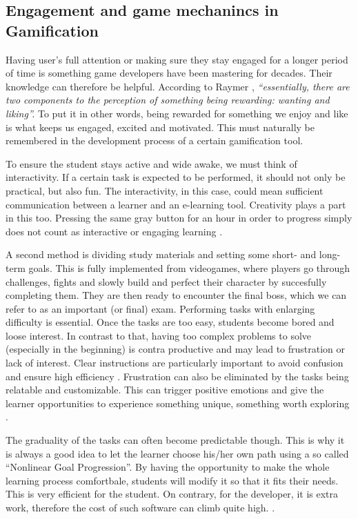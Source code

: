 \documentclass[10pt,english,a4paper]{article}
\begin{document}
\subsection{Engagement and game mechanincs in Gamification} \label{section3.1}
	Having user’s full attention or making sure they stay engaged for a longer period of time is something game developers have been mastering for decades. 
	Their knowledge can therefore be helpful. 
	According to Raymer \cite{Raymer}, \textit{“essentially, there are two components to the perception of something being rewarding: wanting and liking”.} 
	To put it in other words, being rewarded for something we enjoy and like is what keeps us engaged, excited and motivated. 
	This must naturally be remembered in the development process of a certain gamification tool.

	To ensure the student stays active and wide awake, we must think of interactivity. 
	If a certain task is expected to be performed, it should not only be practical, but also fun. 
	The interactivity, in this case, could mean sufficient communication between a learner and an e-learning tool. 
	Creativity plays a part in this too. Pressing the same gray button for an hour in order to progress simply does not count as interactive or engaging learning \cite{ AL-Smadi}. 
	
	A second method is dividing study materials and setting some short- and long-term goals. 
	This is fully implemented from videogames, where players go through challenges, fights and slowly build and perfect their character by succesfully completing them.
	They are then ready to encounter the final boss, which we can refer to as an important (or final) exam. 
	Performing tasks with enlarging difficulty is essential. Once the tasks are too easy, students become bored and loose interest. 
	In contrast to that, having too complex problems to solve (especially in the beginning) is contra productive and may lead to frustration or lack of interest. 
	Clear instructions are particularly important to avoid confusion and ensure high efficiency \cite{Raymer}. 
	Frustration can also be eliminated by the tasks being relatable and customizable. 
	This can trigger positive emotions and give the learner opportunities to experience something unique, something worth exploring \cite{ AL-Smadi}.
	
	The graduality of the tasks can often become predictable though.
	This is why it is always a good idea to let the learner choose his/her own path using a so called “Nonlinear Goal Progression”.
	By having the opportunity to make the whole learning process comfortbale, students will modify it so that it fits their needs. 
	This is very efficient for the student. On contrary, for the developer, it is extra work, therefore the cost of such software can climb quite high. \cite{Raymer}.
\end{document}
